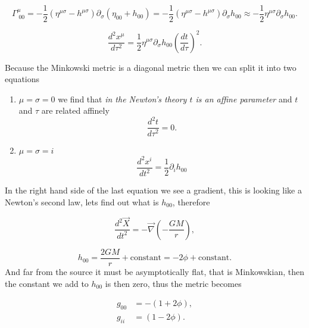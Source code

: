     \begin{equation}
        \Gamma^{\mu}_{\;00} = -\frac{1}{2}\left(\eta^{\mu\sigma} - h^{\mu\sigma} \right)\partial_{\sigma}\left(\eta_{00}+h_{00} \right) = -\frac{1}{2}\left(\eta^{\mu\sigma} - h^{\mu\sigma} \right)\partial_{\sigma}h_{00} \approx -\frac{1}{2}\eta^{\mu\sigma}\partial_{\sigma}h_{00}.
    \end{equation}

    \begin{equation}
        \frac{d^2 x^{\mu}}{d\tau^2} = \frac{1}{2}\eta^{\mu\sigma}\partial_{\sigma}h_{00}\left(\frac{dt}{d\tau} \right)^2.
    \end{equation}

    Because the Minkowski metric is a diagonal metric then we can split it into two equations

    \begin{enumerate}
        \item $\mu=\sigma=0$ we find that \textit{in the Newton's theory $t$ is an affine parameter} and $t$ and $\tau$ are related affinely
        \begin{equation}
            \frac{d^2t}{d\tau^2}=0.
        \end{equation}
        \item  $\mu=\sigma=i$
\begin{equation}
            \frac{d^2 x^i}{dt^2} = \frac{1}{2}\partial_ih_{00}
        \end{equation}


    \end{enumerate}

    In the right hand side of the last equation we see a gradient, this is looking like a Newton's second law, lets find out what is $h_{00}$, therefore 

    \begin{equation}
        \frac{d^2 \Vec{X}}{dt^2} = - \Vec{\nabla}\left(-\frac{GM}{r} \right),
    \end{equation}

    \begin{equation}
        h_{00} = \frac{2GM}{r} + \text{constant} = -2\phi + \text{constant}.
    \end{equation}
    And far from the source it must be asymptotically flat, that is Minkowskian, then the constant we add to $h_{00}$ is then zero, thus the metric becomes

    \begin{align}
        g_{00} &= -(1+2\phi),\\
        g_{ii} &= (1-2\phi).
    \end{align}

